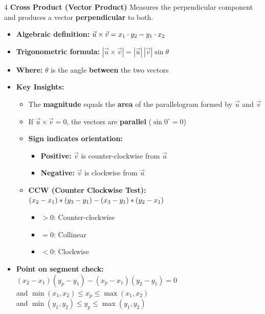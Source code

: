 \begin{multicols*}{4}
\textbf{\newline Cross Product (Vector Product)}
Measures the perpendicular component and produces a vector \textbf{perpendicular} to both.
\begin{itemize}
    \item \textbf{Algebraic definition:} $\vec{u} \times \vec{v} = \crossproduct{x_1}{y_1}{x_2}{y_2}$
    \item \textbf{Trigonometric formula:} $|\vec{u} \times \vec{v}| = |\vec{u}|\,|\vec{v}|\sin\theta$
    \item \textbf{Where:} $\theta$ is the angle \textbf{between} the two vectors
    \item \textbf{Key Insights:}
    \begin{itemize}
        \item The \textbf{magnitude} equals the \textbf{area} of the parallelogram formed by $\vec{u}$ and $\vec{v}$
        \item If $\vec{u} \times \vec{v} = 0$, the vectors are \textbf{parallel} ($\sin 0^\circ = 0$)
        \item \textbf{Sign indicates orientation:}
        \begin{itemize}
            \item \textbf{Positive:} $\vec{v}$ is counter-clockwise from $\vec{u}$
            \item \textbf{Negative:} $\vec{v}$ is clockwise from $\vec{u}$
        \end{itemize}
        \item \textbf{CCW (Counter Clockwise Test):} 
    $\ccw{x_1}{y_1}{x_2}{y_2}{x_3}{y_3}$
    \begin{itemize}
        \item $> 0$: Counter-clockwise
        \item $= 0$: Collinear
        \item $< 0$: Clockwise
    \end{itemize}
    \end{itemize}
    \item \textbf{Point on segment check:} 
    $(x_2 - x_1)(y_p - y_1) - (x_p - x_1)(y_2 - y_1) = 0$ \\
    and $\min(x_1, x_2) \leq x_p \leq \max(x_1, x_2)$ \\
    and $\min(y_1, y_2) \leq y_p \leq \max(y_1, y_2)$
\end{itemize}








\end{multicols*}
